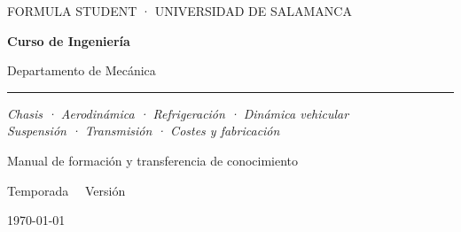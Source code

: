 \begin{titlepage}
\centering
\thispagestyle{empty}

\vspace*{1.5cm}

{\sffamily\Large\color{fusalGris} FORMULA STUDENT · UNIVERSIDAD DE SALAMANCA\par}

\vspace{1.2cm}


\vspace{1.6cm}

{\sffamily\bfseries\Huge\color{fusalPrim} Curso de Ingeniería \FUSAL\par}

\vspace{0.6cm}

{\sffamily\LARGE\color{fusalGris} Departamento de Mecánica\par}

\vspace{0.4cm}
{\color{fusalSec}\rule{9cm}{2pt}}
\vspace{0.8cm}

{\large\itshape Chasis · Aerodinámica · Refrigeración · Dinámica vehicular\\
Suspensión · Transmisión · Costes y fabricación\par}

\vfill

{\sffamily\large Manual de formación y transferencia de conocimiento\par}
\vspace{0.3cm}
{\sffamily\normalsize\color{fusalGris} Temporada \temporada\ \textbar\ Versión \version\par}

\vspace{1cm}
{\small\color{fusalGris}\today\par}

\end{titlepage}

